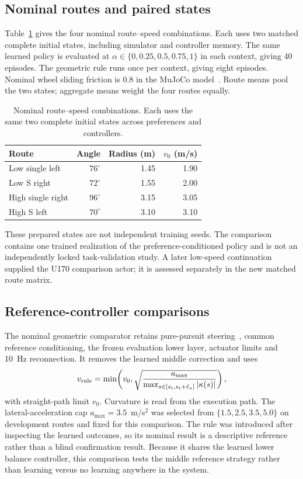 \documentclass[final,5p,times,twocolumn]{elsarticle}
\begin{document}
\subsection{Nominal routes and paired states}
Table~\ref{tab:routes} gives the four nominal route--speed combinations. Each uses two matched complete initial states, including simulator and controller memory. The same learned policy is evaluated at $\alpha\in\{0,0.25,0.5,0.75,1\}$ in each context, giving 40 episodes. The geometric rule runs once per context, giving eight episodes. Nominal wheel sliding friction is 0.8 in the MuJoCo model~\cite{todorov2012}. Route means pool the two states; aggregate means weight the four routes equally.
\begin{table}[t]
\centering\small
\caption{Nominal route--speed combinations. Each uses the same two complete initial states across preferences and controllers.}
\label{tab:routes}
\begin{tabular}{@{}lrrr@{}}
\toprule
Route & Angle & Radius (m) & $v_0$ (m/s)\\
\midrule
Low single left & $76^\circ$ & 1.45 & 1.90\\
Low S right & $72^\circ$ & 1.55 & 2.00\\
High single right & $96^\circ$ & 3.15 & 3.05\\
High S left & $70^\circ$ & 3.10 & 3.10\\
\bottomrule
\end{tabular}
\end{table}
These prepared states are not independent training seeds. The comparison contains one trained realization of the preference-conditioned policy and is not an independently locked task-validation study. A later low-speed continuation supplied the U170 comparison actor; it is assessed separately in the new matched route matrix.

\subsection{Reference-controller comparisons}
The nominal geometric comparator retains pure-pursuit steering~\cite{coulter1992}, common reference conditioning, the frozen evaluation lower layer, actuator limits and 10~Hz reconnection. It removes the learned middle correction and uses
\begin{equation}
 v_{\rm rule}=\min\!\left(v_0,\sqrt{\frac{a_{\max}}{\max_{s\in[s_t,s_t+\ell_\kappa]}|\kappa(s)|}}\right),
\label{eq:rule}
\end{equation}
with straight-path limit $v_0$. Curvature is read from the execution path. The lateral-acceleration cap $a_{\max}=3.5$~m/s$^2$ was selected from $\{1.5,2.5,3.5,5.0\}$ on development routes and fixed for this comparison. The rule was introduced after inspecting the learned outcomes, so its nominal result is a descriptive reference rather than a blind confirmation result. Because it shares the learned lower balance controller, this comparison tests the middle reference strategy rather than learning versus no learning anywhere in the system.
\end{document}
